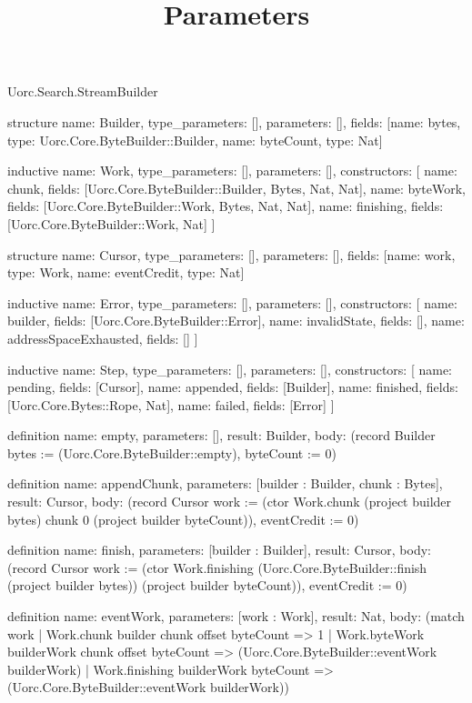 \begin{lexlean}{Uorc.Search.StreamBuilder}
\title{Parameters}
\begin{semanticmodule}
structure{
  name: Builder,
  type_parameters: [],
  parameters: [],
  fields: [{name: bytes, type: Uorc.Core.ByteBuilder::Builder}, {name: byteCount, type: Nat}]
}

inductive{
  name: Work,
  type_parameters: [],
  parameters: [],
  constructors: [
    {name: chunk, fields: [Uorc.Core.ByteBuilder::Builder, Bytes, Nat, Nat]},
    {name: byteWork, fields: [Uorc.Core.ByteBuilder::Work, Bytes, Nat, Nat]},
    {name: finishing, fields: [Uorc.Core.ByteBuilder::Work, Nat]}
  ]
}

structure{
  name: Cursor,
  type_parameters: [],
  parameters: [],
  fields: [{name: work, type: Work}, {name: eventCredit, type: Nat}]
}

inductive{
  name: Error,
  type_parameters: [],
  parameters: [],
  constructors: [
    {name: builder, fields: [Uorc.Core.ByteBuilder::Error]},
    {name: invalidState, fields: []},
    {name: addressSpaceExhausted, fields: []}
  ]
}

inductive{
  name: Step,
  type_parameters: [],
  parameters: [],
  constructors: [
    {name: pending, fields: [Cursor]},
    {name: appended, fields: [Builder]},
    {name: finished, fields: [Uorc.Core.Bytes::Rope, Nat]},
    {name: failed, fields: [Error]}
  ]
}

definition{
  name: empty,
  parameters: [],
  result: Builder,
  body: (record Builder {bytes := (Uorc.Core.ByteBuilder::empty), byteCount := 0})
}

definition{
  name: appendChunk,
  parameters: [builder : Builder, chunk : Bytes],
  result: Cursor,
  body: (record Cursor {work := (ctor Work.chunk (project builder bytes) chunk 0 (project builder byteCount)), eventCredit := 0})
}

definition{
  name: finish,
  parameters: [builder : Builder],
  result: Cursor,
  body: (record Cursor {work := (ctor Work.finishing (Uorc.Core.ByteBuilder::finish (project builder bytes)) (project builder byteCount)), eventCredit := 0})
}

definition{
  name: eventWork,
  parameters: [work : Work],
  result: Nat,
  body: (match work
    | Work.chunk builder chunk offset byteCount => 1
    | Work.byteWork builderWork chunk offset byteCount => (Uorc.Core.ByteBuilder::eventWork builderWork)
    | Work.finishing builderWork byteCount => (Uorc.Core.ByteBuilder::eventWork builderWork))
}


\end{semanticmodule}
\end{lexlean}
